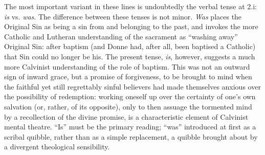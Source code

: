 \begin{paper}
The most important variant in these lines is undoubtedly the verbal
tense at 2.i: \emph{is} vs. \emph{was}. The difference between these
tenses is not minor. \emph{Was} places the Original Sin as being a sin
from and belonging to the past, and invokes the more Catholic and
Lutheran understanding of the sacrament as ``washing away'' Original
Sin: after baptism (and Donne had, after all, been baptised a Catholic)
that Sin could no longer be his. The present tense, \emph{is}, however,
suggests a much more Calvinist understanding of the role of baptism.
This was not an outward sign of inward grace, but a promise of
forgiveness, to be brought to mind when the faithful yet still
regrettably sinful believers had made themselves anxious over the
possibility of redemption: working oneself up over the certainty of
one's own salvation (or, rather, of its opposite), only to then assuage
the tormented mind by a recollection of the divine promise, is a
characteristic element of Calvinist mental theatre. ``Is'' must be the
primary reading; ``was'' introduced at first as a scribal quibble,
rather than as a simple replacement, a quibble brought about by a
divergent theological sensibility.


\end{paper}
